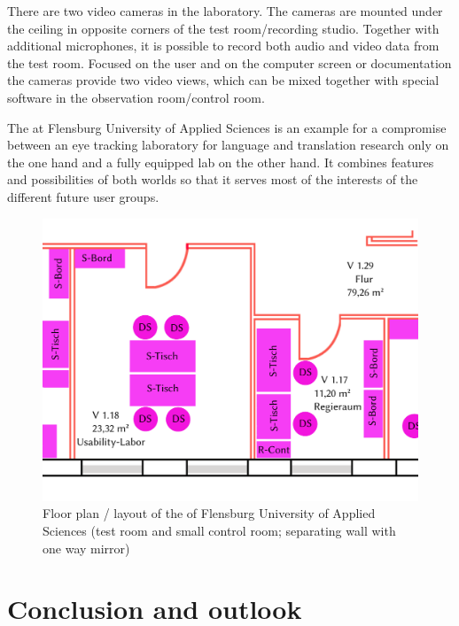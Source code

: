 \documentclass[output=paper]{langsci/langscibook}
\begin{document}
There are two video cameras in the laboratory. The cameras are mounted under the ceiling in opposite corners of the test room/recording studio. Together with additional microphones, it is possible to record both audio and video data from the test room. Focused on the user and on the computer screen or documentation the cameras provide two video views, which can be mixed together with special software in the observation room/control room. 



The  at Flensburg University of Applied Sciences is an example for a compromise between an eye tracking laboratory for language and translation research only on the one hand and a fully equipped  lab on the other hand. It combines features and possibilities of both worlds so that it serves most of the interests of the different future user groups. 


\begin{figure}
 \includegraphics[width=.8\textwidth]{figures/roesener7b.pdf} 

 \caption{Floor plan / layout of the  of Flensburg University of Applied Sciences (test room and small control room; separating wall with one way mirror)
}
 \label{roesener:fig:7}
\end{figure} 


\section{Conclusion and outlook }
\end{document}

